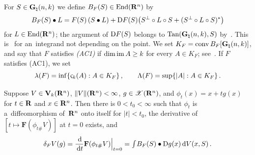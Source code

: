 \documentclass[a4paper,twoside,leqno]{article}
\newcommand{\sv}[1]{\varsigma_{#1}}        %
\begin{document}
\begin{definition}
    \label{def:BF}
    For $S \in \mathbf{G}_{\natural}(n,k)$ we define $B_F(S) \in \mathrm{End}({\mathbf{R}^{n}})$ by
    \begin{displaymath}
        B_F(S) \bullet L = F(S) \, (S \bullet L) + \mathrm{D} F(S) \bigl( S^\perp \circ L \circ S +
        (S^\perp \circ L \circ S)^{*} \bigr)
    \end{displaymath}
    for $L \in \mathrm{End}({\mathbf{R}^{n}})$;
    the argument of $\mathrm{D} F(S)$ belongs to $\operatorname{Tan}(\mathbf{G}_{\natural}(n,k),S)$
    by~\cite[Lemma~A.1]{DePhilippis2018}. This is~\cite[(A.5)]{DePhilippis2018} for an~integrand
    not depending on the point. We set $K_F = \operatorname{conv} B_F[\mathbf{G}_{\natural}(n,k)]$, and say that $F$
    satisfies \emph{(AC1)} if $\dim \operatorname{im} A \ge k$ for every $A \in K_F$;
    see~\cite[section~1.2]{DePhilippisGennaioliPigatiRindler2026}. If $F$ satisfies (AC1), we set
    \begin{displaymath}
        \lambda(F) = \inf \{ \sv{\vdim}(A) : A \in K_F \} \,, \qquad
        \Lambda(F) = \sup \{ |A| : A \in K_F \} \,.
    \end{displaymath}
\end{definition}

\begin{lemma}
    \label{lem:first_variation}
    Suppose $V \in \mathbf{V}_{k}(\mathbf{R}^{n})$, $\|V\|(\mathbf{R}^{n}) < \infty$, $g \in
    \mathscr{X}(\mathbf{R}^{n})$, and $\phi_t(x) = x + t g(x)$ for $t \in \mathbf{R}$ and $x \in \mathbf{R}^{n}$. Then
    there is $0 < t_0 < \infty$ such that $\phi_t$ is a~diffeomorphism of~$\mathbf{R}^{n}$ onto
    itself for $|t| < t_0$, the derivative of $[t \mapsto \mathbf{F}(\phi_{t\#} V)]$ at $t = 0$
    exists, and
    \begin{displaymath}
        \delta_F V(g) = \frac{\,\mathrm{d}}{\,\mathrm{d} t} \mathbf{F}(\phi_{t\#} V) \Big|_{t=0} = {\textstyle\int_{}^{}}
        B_F(S) \bullet \mathrm{D} g(x) \,\mathrm{d} V(x,S) \,.
    \end{displaymath}
\end{lemma}
\end{document}
